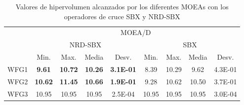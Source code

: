 \begin{table}[t]
\begin{center}
\begin{scriptsize}
\centering
\caption{Valores de hipervolumen alcanzados por los diferentes MOEAs con los operadores de cruce SBX y NRD-SBX}
\label{tab:Estadisticas_HV}
\begin{tabular}{ccccccccc}
                           & \multicolumn{8}{c}{MOEA/D}                                                                                                                                                                                                                                                                                     \\ \cline{2-9} 
\multicolumn{1}{c|}{}      & \multicolumn{4}{c|}{NRD-SBX}                                                                                                                             & \multicolumn{4}{c|}{SBX}                                                                                                                             \\ \hline
\multicolumn{1}{|c|}{}     & \multicolumn{1}{c|}{Min.}            & \multicolumn{1}{c|}{Max.}            & \multicolumn{1}{c|}{Media}           & \multicolumn{1}{c|}{Desv.}               & \multicolumn{1}{c|}{Min.}           & \multicolumn{1}{c|}{Max.}           & \multicolumn{1}{c|}{Media}          & \multicolumn{1}{c|}{Desv.}               \\ \hline
\multicolumn{1}{|c|}{WFG1} & \multicolumn{1}{c|}{\textbf{9.61}}  & \multicolumn{1}{c|}{\textbf{10.72}} & \multicolumn{1}{c|}{\textbf{10.26}} & \multicolumn{1}{c|}{\textbf{3.1E-01}} & \multicolumn{1}{c|}{8.39}          & \multicolumn{1}{c|}{10.29}         & \multicolumn{1}{c|}{9.62}          & \multicolumn{1}{c|}{4.3E-01}          \\ \hline
\multicolumn{1}{|c|}{WFG2} & \multicolumn{1}{c|}{\textbf{10.62}} & \multicolumn{1}{c|}{\textbf{11.45}} & \multicolumn{1}{c|}{\textbf{10.66}} & \multicolumn{1}{c|}{\textbf{1.9E-01}} & \multicolumn{1}{c|}{9.28}          & \multicolumn{1}{c|}{10.62}         & \multicolumn{1}{c|}{10.50}         & \multicolumn{1}{c|}{3.7E-01}          \\ \hline
\multicolumn{1}{|c|}{WFG3} & \multicolumn{1}{c|}{10.95}          & \multicolumn{1}{c|}{10.95}          & \multicolumn{1}{c|}{10.95}          & \multicolumn{1}{c|}{2.5E-04}          & \multicolumn{1}{c|}{10.95}         & \multicolumn{1}{c|}{10.95}         & \multicolumn{1}{c|}{10.95}         & \multicolumn{1}{c|}{3.0E-04}          \\ \hline

\end{tabular}
\end{scriptsize}
\end{center}
\end{table}
